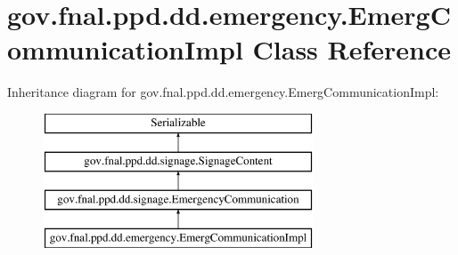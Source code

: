 \hypertarget{classgov_1_1fnal_1_1ppd_1_1dd_1_1emergency_1_1EmergCommunicationImpl}{\section{gov.\-fnal.\-ppd.\-dd.\-emergency.\-Emerg\-Communication\-Impl Class Reference}
\label{classgov_1_1fnal_1_1ppd_1_1dd_1_1emergency_1_1EmergCommunicationImpl}
}
Inheritance diagram for gov.\-fnal.\-ppd.\-dd.\-emergency.\-Emerg\-Communication\-Impl\-:\begin{figure}[H]
\begin{center}
\leavevmode
\includegraphics[height=4.000000cm]{classgov_1_1fnal_1_1ppd_1_1dd_1_1emergency_1_1EmergCommunicationImpl}
\end{center}
\end{figure}
